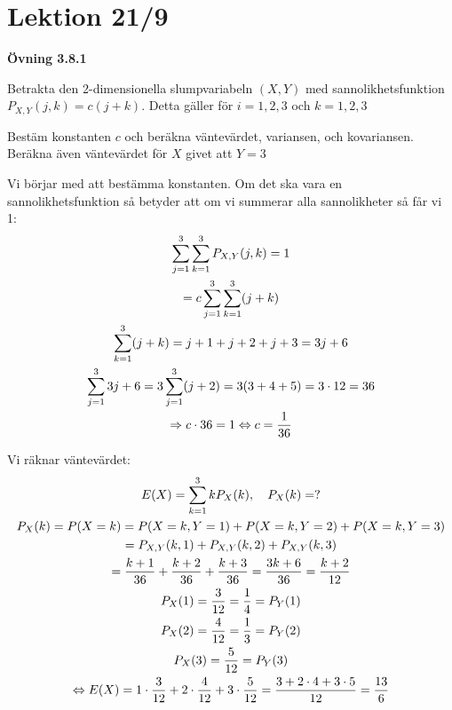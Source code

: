 \section{Lektion 21/9}\par
\noindent\textbf{Övning 3.8.1}\par
\noindent Betrakta den 2-dimensionella slumpvariabeln $(X,Y)$ med sannolikhetsfunktion $P_{X,Y}(j,k) = c(j+k)$. Detta gäller för $i=1,2,3$ och $k=1,2,3$\par
\noindent Bestäm konstanten $c$ och beräkna väntevärdet, variansen, och kovariansen. Beräkna även väntevärdet för $X$ givet att $Y=3$
\par\bigskip
\noindent Vi börjar med att bestämma konstanten. Om det ska vara en sannolikhetsfunktion så betyder att om vi summerar alla sannolikheter så får vi 1:
\begin{equation*}
  \begin{gathered}
    \sum_{j=1}^{3}\sum_{k=1}^{3}P_{X,Y}(j,k)=1\\
    = c\sum_{j=1}^{3}\sum_{k=1}^{3}(j+k)\\
    \sum_{k=1}^{3}(j+k)=j+1+j+2+j+3 = 3j+6\\
    \sum_{j=1}^{3}3j+6 =3\sum_{j=1}^{3}(j+2)=3(3+4+5) = 3\cdot12=36\\
    \Rightarrow c\cdot36 = 1\Leftrightarrow c = \dfrac{1}{36}
  \end{gathered}
\end{equation*}
\par\bigskip
\noindent Vi räknar väntevärdet:
\begin{equation*}
  \begin{gathered}
    E(X) = \sum_{k=1}^{3}kP_X(k),\quad P_X(k)=?\\
    P_X(k) = P(X=k)=P(X=k,Y=1)+P(X=k,Y=2)+P(X=k,Y=3)\\
    =P_{X,Y}(k,1)+P_{X,Y}(k,2)+P_{X,Y}(k,3)\\
    =\dfrac{k+1}{36}+\dfrac{k+2}{36}+\dfrac{k+3}{36} = \dfrac{3k+6}{36} = \dfrac{k+2}{12}\\
    P_X(1) = \dfrac{3}{12} = \dfrac{1}{4} = P_Y(1)\\
    P_X(2) = \dfrac{4}{12} = \dfrac{1}{3} = P_Y(2)\\
    P_X(3) = \dfrac{5}{12} = P_Y(3)\\
    \Leftrightarrow E(X) = 1\cdot\dfrac{3}{12}+2\cdot\dfrac{4}{12}+3\cdot\dfrac{5}{12} = \dfrac{3+2\cdot4+3\cdot5}{12} = \dfrac{13}{6}
  \end{gathered}
\end{equation*}
\par\bigskip
